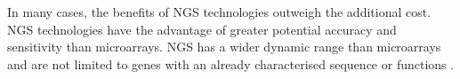 %
In many cases, the benefits of \gls{NGS} technologies outweigh the additional cost. \gls{NGS} technologies have the advantage of greater potential accuracy and sensitivity than \glspl{microarray}. %
\gls{NGS} has a wider dynamic range than \glspl{microarray} and %
are not limited to genes with an already characterised sequence or functions \citep{Tarazona2011}. %


